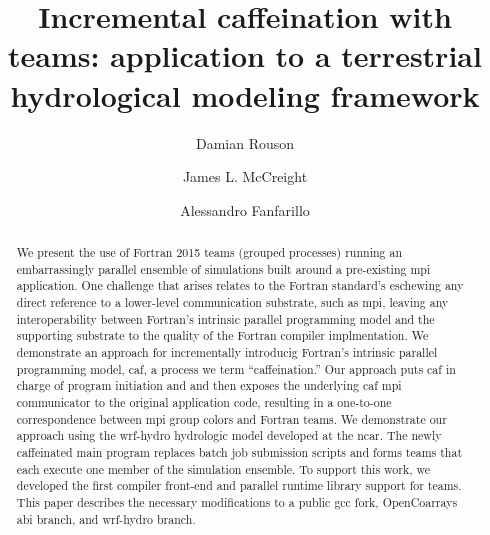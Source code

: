 \documentclass[sigconf, authordraft]{acmart}
\begin{document}
\title{Incremental caffeination with teams: application to a terrestrial hydrological modeling framework}


\author{Damian Rouson}
\renewcommand{\shortauthors}{D. Rouson et al.}

\author{James L. McCreight}

\author{Alessandro Fanfarillo}

\begin{abstract}
We present the use of Fortran 2015 teams (grouped processes) running an embarrassingly
parallel ensemble of simulations built around a pre-existing \gls{mpi} application.  One
challenge that arises relates to the Fortran standard's eschewing any direct reference to
a lower-level communication substrate, such as \gls{mpi}, leaving any interoperability
between Fortran's intrinsic parallel programming model and the supporting substrate to
the quality of the Fortran compiler implmentation.  We demonstrate an approach for
incrementally introducig Fortran's intrinsic parallel programming model, \gls{caf}, a process
we term ``caffeination.''  Our approach puts \gls{caf} in charge of program initiation and
and then exposes the underlying \gls{caf} \gls{mpi} communicator to the original application
code,  resulting in a one-to-one correspondence between \gls{mpi} group colors and Fortran
teams.  We demonstrate our approach using the \gls{wrf-hydro} hydrologic model developed at
the \gls{ncar}.  The newly caffeinated main program replaces batch job submission scripts
and forms teams that each execute one member of the simulation ensemble.   To support
this work, we developed the first compiler front-end and parallel runtime library support
for teams.  This paper describes the necessary modifications to a public \gls{gcc} fork,
OpenCoarrays \gls{abi} branch, and \gls{wrf-hydro} branch.
\end{abstract}
\end{document}
